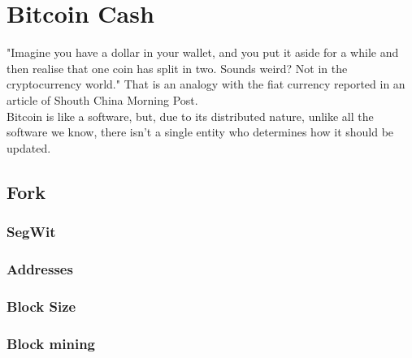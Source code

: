 \chapter{Bitcoin Cash}
\label{cha:bch}

"Imagine you have a dollar in your wallet, and you put it aside for a while and 
then realise that one coin has split in two. Sounds weird? Not in the cryptocurrency 
world." That is an analogy with the fiat currency reported in an article of 
Shouth China Morning Post\cite{scmp}.\\
Bitcoin is like a software, but, due to its distributed nature, unlike all the 
software we know, there isn't a single entity who determines how it should be 
updated. 

\section{Fork}
\label{sec:fork}

\subsection{SegWit}
\label{sec:segwit}

\subsection{Addresses}
\label{sec:addresses}

\subsection{Block Size}
\label{sec:blocksize}

\subsection{Block mining}
\label{sec:mining}
